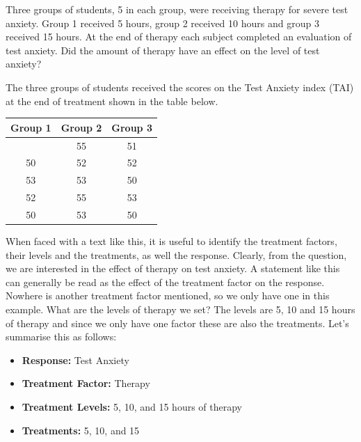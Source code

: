 \documentclass[
  letterpaper,
]{book}
\providecommand{\tightlist}{%
  \setlength{\itemsep}{0pt}\setlength{\parskip}{0pt}}\usepackage{longtable,booktabs,array}
\begin{document}
\begin{tcolorbox}[enhanced jigsaw, opacitybacktitle=0.6, colbacktitle=quarto-callout-warning-color!10!white, toprule=.15mm, bottomtitle=1mm, breakable, leftrule=.75mm, rightrule=.15mm, left=2mm, colback=white, coltitle=black, toptitle=1mm, colframe=quarto-callout-warning-color-frame, bottomrule=.15mm, title={Example 1}, arc=.35mm, titlerule=0mm, opacityback=0]

Three groups of students, 5 in each group, were receiving therapy for
severe test anxiety. Group 1 received 5 hours, group 2 received 10 hours
and group 3 received 15 hours. At the end of therapy each subject
completed an evaluation of test anxiety. Did the amount of therapy have
an effect on the level of test anxiety?

The three groups of students received the scores on the Test Anxiety
index (TAI) at the end of treatment shown in the table below.

\begin{longtable}[]{@{}ccc@{}}
\toprule\noalign{}
Group 1 & Group 2 & Group 3 \\
\midrule\noalign{}
\endhead
\bottomrule\noalign{}
\endlastfoot
48 & 55 & 51 \\
50 & 52 & 52 \\
53 & 53 & 50 \\
52 & 55 & 53 \\
50 & 53 & 50 \\
\end{longtable}

\hfill\break

\end{tcolorbox}

When faced with a text like this, it is useful to identify the treatment
factors, their levels and the treatments, as well the response. Clearly,
from the question, we are interested in the effect of therapy on test
anxiety. A statement like this can generally be read as the effect of
the treatment factor on the response. Nowhere is another treatment
factor mentioned, so we only have one in this example. What are the
levels of therapy we set? The levels are 5, 10 and 15 hours of therapy
and since we only have one factor these are also the treatments. Let's
summarise this as follows:

\begin{itemize}
\tightlist
\item
  \textbf{Response:} Test Anxiety\\
\item
  \textbf{Treatment Factor:} Therapy\\
\item
  \textbf{Treatment Levels:} 5, 10, and 15 hours of therapy\\
\item
  \textbf{Treatments:} 5, 10, and 15
\end{itemize}
\end{document}
